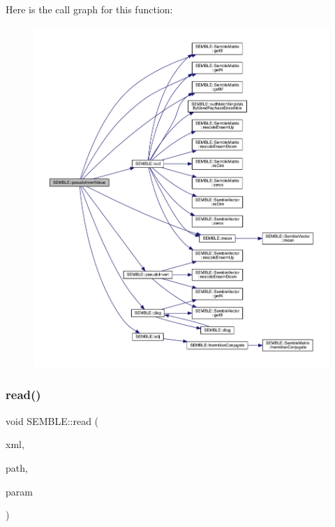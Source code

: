 Here is the call graph for this function\+:
\nopagebreak
\begin{figure}[H]
\begin{center}
\leavevmode
\includegraphics[width=350pt]{d7/dfd/namespaceSEMBLE_abf6d50f5d45b7e87cafac5e1ad6c5225_cgraph}
\end{center}
\end{figure}
\mbox{\label{namespaceSEMBLE_ab4728ebf9760db0c2af2c3c44d099e05}} 
\subsubsection{\texorpdfstring{read()}{read()}}
{\footnotesize\ttfamily void S\+E\+M\+B\+L\+E\+::read (\begin{DoxyParamCaption}\item[{X\+M\+L\+Reader \&}]{xml,  }\item[{const std\+::string \&}]{path,  }\item[{\mbox{\hyperlink{structSEMBLE_1_1opsxml__t}{opsxml\+\_\+t}} \&}]{param }\end{DoxyParamCaption})}

